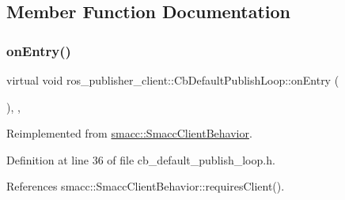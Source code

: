 \subsection{Member Function Documentation}
\mbox{\label{classros__publisher__client_1_1CbDefaultPublishLoop_ada860aab5d8887e8671a6ae7f4b22e76}} 
\subsubsection{\texorpdfstring{on\+Entry()}{onEntry()}}
{\footnotesize\ttfamily virtual void ros\+\_\+publisher\+\_\+client\+::\+Cb\+Default\+Publish\+Loop\+::on\+Entry (\begin{DoxyParamCaption}{ }\end{DoxyParamCaption})\hspace{0.3cm}{\ttfamily [inline]}, {\ttfamily [override]}, {\ttfamily [virtual]}}



Reimplemented from \hyperlink{classsmacc_1_1SmaccClientBehavior_a7962382f93987c720ad432fef55b123f}{smacc\+::\+Smacc\+Client\+Behavior}.



Definition at line 36 of file cb\+\_\+default\+\_\+publish\+\_\+loop.\+h.



References smacc\+::\+Smacc\+Client\+Behavior\+::requires\+Client().


